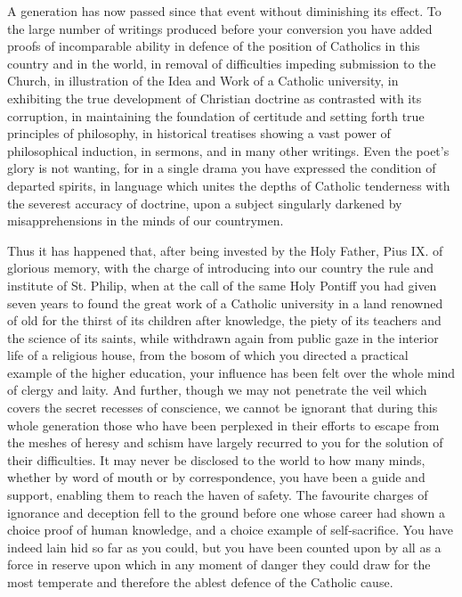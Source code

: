 A generation has now passed since that event without diminishing
its effect. To the large number of writings produced before your
conversion you have added proofs of incomparable ability in defence of
the position of Catholics in this country and in the world, in removal
of difficulties impeding submission to the Church, in illustration of
the Idea and Work of a Catholic university, in exhibiting the true
development of Christian doctrine as contrasted with its corruption,
in maintaining the foundation of certitude and setting forth true
principles of philosophy, in historical treatises showing a vast power
of philosophical induction, in sermons, and in many other writings.
Even the poet's glory is not wanting, for in a single drama you have
expressed the condition of departed spirits, in language which unites
the depths of Catholic tenderness with the severest accuracy of
doctrine, upon a subject singularly darkened by misapprehensions in
the minds of our countrymen.

Thus it has happened that, after being invested by the Holy Father,
Pius IX. of glorious memory, with the charge of introducing into our
country the rule and institute of St. Philip, when at the call of the
same Holy Pontiff you had given seven years to found the great work of
a Catholic university in a land renowned of old for the thirst of its
children after knowledge, the piety of its teachers and the science of
its saints, while withdrawn again from public gaze in the interior
life of a religious house, from the bosom of which you directed
a practical example of the higher education, your influence has been
felt over the whole mind of clergy and laity. And further, though we
may not penetrate the veil which covers the secret recesses of
conscience, we cannot be ignorant that during this whole generation
those who have been perplexed in their efforts to escape from the
meshes of heresy and schism have largely recurred to you for the
solution of their difficulties. It may never be disclosed to the world
to how many minds, whether by word of mouth or by correspondence, you
have been a guide and support, enabling them to reach the haven of
safety. The favourite charges of ignorance and deception fell to the
ground before one whose career had shown a choice proof of human
knowledge, and a choice example of self-sacrifice. You have indeed
lain hid so far as you could, but you have been counted upon by all as
a force in reserve upon which in any moment of danger they could draw
for the most temperate and therefore the ablest defence of the
Catholic cause.

